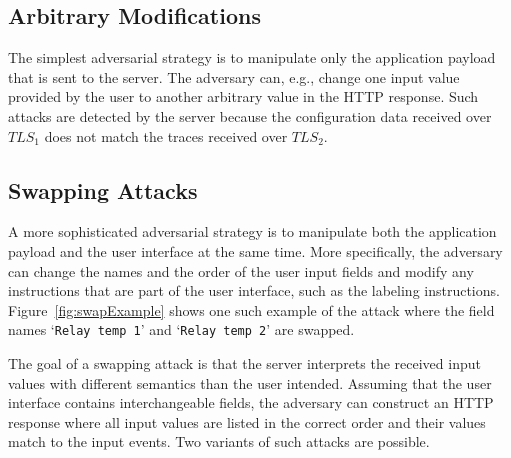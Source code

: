 \subsection{Arbitrary Modifications} 

The simplest adversarial strategy is to manipulate only the application payload that is sent to the server. The adversary can, e.g., change one input value provided by the user to another arbitrary value in the HTTP response. Such attacks are detected by the server because the configuration data received over $TLS_1$ does not match the traces received over $TLS_2$.


\subsection{Swapping Attacks}

A more sophisticated adversarial strategy is to manipulate both the application payload and the user interface at the same time. More specifically, the adversary can change the names and the order of the user input fields and modify any instructions that are part of the user interface, such as the labeling instructions. Figure~\ref{fig:swapExample} shows one such example of the attack where the field names `\texttt{Relay temp 1}' and `\texttt{Relay temp 2}' are swapped.


The goal of a swapping attack is that the server interprets the received input values with different semantics than the user intended. Assuming that the user interface contains interchangeable fields, the adversary can construct an HTTP response where all input values are listed in the correct order and their values match to the input events. Two variants of such attacks are possible. 

